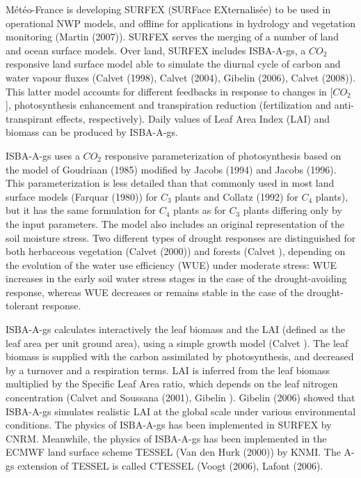 {M\'et\'eo-France is developing SURFEX (SURFace EXternalis\'ee) to be used in operational NWP
models, and offline for applications in hydrology and vegetation monitoring (Martin \etal (2007)\nocite{Martin2007}).
SURFEX serves the merging of a number of land and ocean surface models. Over land, SURFEX
includes ISBA-A-gs, a $CO_{2}$ responsive land surface model able to simulate the diurnal cycle of carbon
and water vapour fluxes (Calvet \etal (1998)\nocite{Calvet1998a}, Calvet \etal (2004)\nocite{Calvet2004}, Gibelin \etal (2006)\nocite{Gibelin2006}, Calvet \etal (2008)\nocite{Calvet2008}). 
This latter model accounts for different feedbacks in response to changes in [$CO_{2}$],
photosynthesis enhancement and transpiration reduction (fertilization and anti-transpirant effects,
respectively). Daily values of Leaf Area Index (LAI) and biomass can be produced by ISBA-A-gs.

ISBA-A-gs uses a $CO_{2}$ responsive parameterization of photosynthesis based on the model of
Goudriaan \etal (1985)\nocite{Goudriaan1985} modified by Jacobs (1994)\nocite{Jacobs1994} and Jacobs \etal (1996)\nocite{Jacobs1996}. This parameterization is
less detailed than that commonly used in most land surface models (Farquar \etal (1980)\nocite{Farquhar1980}) for $C_{3}$
plants and Collatz \etal (1992)\nocite{Collatz1992} for $C_{4}$ plants), but it has the same formulation for $C_{4}$ plants as for $C_{3}$
plants differing only by the input parameters. The model also includes an original representation of the
soil moisture stress. Two different types of drought responses are distinguished for both herbaceous
vegetation (Calvet (2000)\nocite{Calvet2000}) and forests (Calvet ), depending on the evolution of the water
use efficiency (WUE) under moderate stress: WUE increases in the early soil water stress stages in
the case of the drought-avoiding response, whereas WUE decreases or remains stable in the case of
the drought-tolerant response.

ISBA-A-gs calculates interactively the leaf biomass and the LAI (defined as the leaf area per unit
ground area), using a simple growth model (Calvet ). The leaf biomass is supplied with the
carbon assimilated by photosynthesis, and decreased by a turnover and a respiration terms. LAI is
inferred from the leaf biomass multiplied by the Specific Leaf Area ratio, which depends on the leaf
nitrogen concentration (Calvet and Soussana (2001)\nocite{Calvet2001}, Gibelin ). Gibelin \etal (2006) showed
that ISBA-A-gs simulates realistic LAI at the global scale under various environmental conditions.
The physics of ISBA-A-gs has been implemented in SURFEX by CNRM. Meanwhile, the physics of
ISBA-A-gs has been implemented in the ECMWF land surface scheme TESSEL (Van den Hurk \etal (2000)\nocite{VandenHurk2000})
by KNMI. The A-gs extension of TESSEL is called CTESSEL (Voogt \etal (2006)\nocite{Voogt2006}, Lafont \etal (2006)\nocite{Lafont2006}.

}
